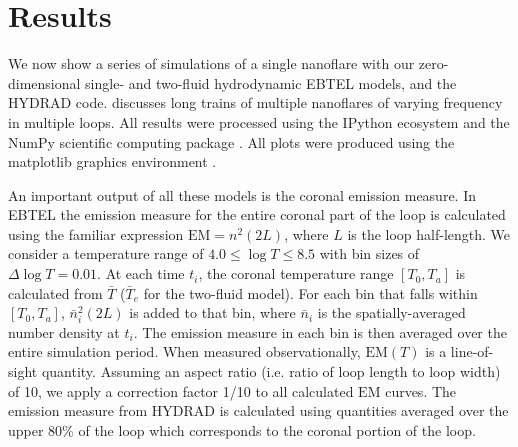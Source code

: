 \documentclass[iop]{emulateapj}
\begin{document}
	\section{Results}
	\label{sec:results}
	\par We now show a series of simulations of a single nanoflare with our zero-dimensional single- and two-fluid hydrodynamic EBTEL models, and the HYDRAD code.  discusses long trains of multiple nanoflares of varying frequency in multiple loops. All results were processed using the IPython ecosystem \citep{perez_ipython:_2007} and the NumPy scientific computing package \citep{van_der_walt_numpy_2011}. All plots were produced using the matplotlib graphics environment \citep{hunter_matplotlib:_2007}.
	\par An important output of all these models is the coronal emission measure. In EBTEL the emission measure for the entire coronal part of the loop is calculated using the familiar expression $\mathrm{EM}=n^2(2L)$, where $L$ is the loop half-length. We consider a temperature range of $4.0\le\log{T}\le8.5$ with bin sizes of $\Delta\log{T}=0.01$. At each time $t_i$, the coronal temperature range $[T_0,T_a]$ is calculated from $\bar{T}$ ($\bar{T}_e$ for the two-fluid model). For each bin that falls within $[T_0,T_a]$, $\bar{n}_i^2(2L)$ is added to that bin, where $\bar{n}_i$ is the spatially-averaged number density at $t_i$. The emission measure in each bin is then averaged over the entire simulation period. When measured observationally, $\mathrm{EM}(T)$ is a line-of-sight quantity. Assuming an aspect ratio (i.e. ratio of loop length to loop width) of 10, we apply a correction factor 1/10 to all calculated $\mathrm{EM}$ curves. The emission measure from HYDRAD is calculated using quantities averaged over the upper 80\% of the loop which corresponds to the coronal portion of the loop.
\end{document}
